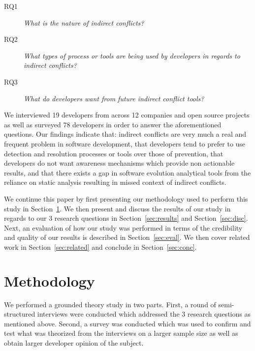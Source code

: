 \documentclass[conference]{IEEEtran}
\makeatletter
\def\namedlabel#1#2{\begingroup
   \def\@currentlabel{#2}%
   \label{#1}\endgroup
}
\makeatother
\begin{document}
\begin{description}
	\item[RQ1\namedlabel{itm:rq1}{RQ1}] \textit{What is the nature of indirect conflicts?}
	\item[RQ2\namedlabel{itm:rq2}{RQ2}] \textit{What types of process or tools are being used by developers in regards to indirect conflicts?}
	\item[RQ3\namedlabel{itm:rq3}{RQ3}] \textit{What do developers want from future indirect conflict tools?}
\end{description}

We interviewed 19 developers from across 12 companies and open source projects as well as surveyed 78 
developers in order to answer the aforementioned questions. Our findings indicate that: indirect conflicts are very much a real 
and frequent problem in software development, that developers tend to prefer to use detection and resolution processes or tools
over those of prevention, that developers do not want awareness mechanisms which provide non actionable results, 
and that there exists a gap in software evolution analytical tools from the reliance on static analysis resulting in missed
context of indirect conflicts.

We continue this paper by first presenting our methodology used to perform this study in Section~\ref{sec:meth}. We
then present and discuss the results of our study in regards to our 3 research questions in Section~\ref{sec:results}
and Section~\ref{sec:disc}.
Next, an evaluation of how our study was performed in terms of the credibility
and quality of our results is described in Section~\ref{sec:eval}. We then cover related work in Section~\ref{sec:related}
and conclude in Section~\ref{sec:conc}.

\section{Methodology}
\label{sec:meth}

We performed a grounded theory study in two parts. First, a round of semi-structured interviews were conducted which 
addressed the 3 research questions as mentioned above. Second, a survey was conducted
which was used to confirm and test what was theorized from the interviews on a larger sample size as well as obtain
larger developer opinion of the subject.
\end{document}
